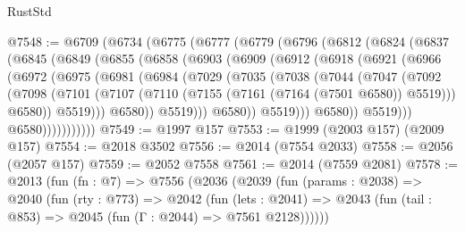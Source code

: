 \begin{lexlean}{RustStd}
\begin{coremodule}
@7548 := @6709
    (@6734
      (@6775
        (@6777
          (@6779
            (@6796
              (@6812
                (@6824
                  (@6837
                    (@6845
                      (@6849
                        (@6855
                          (@6858
                            (@6903
                              (@6909
                                (@6912
                                  (@6918
                                    (@6921
                                      (@6966
                                        (@6972
                                          (@6975
                                            (@6981
                                              (@6984
                                                (@7029
                                                  (@7035
                                                    (@7038
                                                      (@7044
                                                        (@7047
                                                          (@7092
                                                            (@7098
                                                              (@7101
                                                                (@7107
                                                                  (@7110
                                                                    (@7155
                                                                      (@7161
                                                                        (@7164 (@7501 @6580))
                                                                        @5519)))
                                                                  @6580))
                                                              @5519)))
                                                        @6580))
                                                    @5519)))
                                              @6580))
                                          @5519)))
                                    @6580))
                                @5519)))
                          @6580)))))))))))
@7549 := @1997 @157
@7553 := @1999 (@2003 @157) (@2009 @157)
@7554 := @2018 @3502
@7556 := @2014 (@7554 @2033)
@7558 := @2056 (@2057 @157)
@7559 := @2052 @7558
@7561 := @2014 (@7559 @2081)
@7578 := @2013
    (fun (fn : @7) =>
    @7556
      (@2036
        (@2039
          (fun (params : @2038) =>
          @2040
            (fun (rty : @773) =>
            @2042
              (fun (lets : @2041) =>
              @2043 (fun (tail : @853) => @2045 (fun (Γ : @2044) => @7561 @2128))))))

\end{coremodule}
\end{lexlean}
